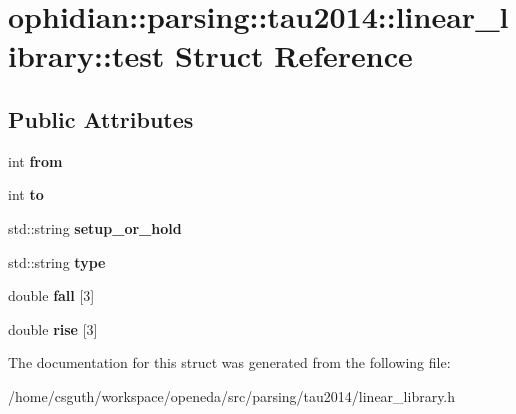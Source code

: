 \hypertarget{structophidian_1_1parsing_1_1tau2014_1_1linear__library_1_1test}{\section{ophidian\-:\-:parsing\-:\-:tau2014\-:\-:linear\-\_\-library\-:\-:test Struct Reference}
\label{structophidian_1_1parsing_1_1tau2014_1_1linear__library_1_1test}
}
\subsection*{Public Attributes}
\begin{DoxyCompactItemize}
\item 
\hypertarget{structophidian_1_1parsing_1_1tau2014_1_1linear__library_1_1test_a6c64fb1453fa088de253eb3b6b1468bf}{int {\bfseries from}}\label{structophidian_1_1parsing_1_1tau2014_1_1linear__library_1_1test_a6c64fb1453fa088de253eb3b6b1468bf}

\item 
\hypertarget{structophidian_1_1parsing_1_1tau2014_1_1linear__library_1_1test_a53e8a0b5c182065077f151941b2cd5f5}{int {\bfseries to}}\label{structophidian_1_1parsing_1_1tau2014_1_1linear__library_1_1test_a53e8a0b5c182065077f151941b2cd5f5}

\item 
\hypertarget{structophidian_1_1parsing_1_1tau2014_1_1linear__library_1_1test_a3ab41fae0e60c62d3907d91574afbf66}{std\-::string {\bfseries setup\-\_\-or\-\_\-hold}}\label{structophidian_1_1parsing_1_1tau2014_1_1linear__library_1_1test_a3ab41fae0e60c62d3907d91574afbf66}

\item 
\hypertarget{structophidian_1_1parsing_1_1tau2014_1_1linear__library_1_1test_ab676508e244f448dcd7d90905894f9ed}{std\-::string {\bfseries type}}\label{structophidian_1_1parsing_1_1tau2014_1_1linear__library_1_1test_ab676508e244f448dcd7d90905894f9ed}

\item 
\hypertarget{structophidian_1_1parsing_1_1tau2014_1_1linear__library_1_1test_afc455192107b8c47dd5b6d0597e861c3}{double {\bfseries fall} \mbox{[}3\mbox{]}}\label{structophidian_1_1parsing_1_1tau2014_1_1linear__library_1_1test_afc455192107b8c47dd5b6d0597e861c3}

\item 
\hypertarget{structophidian_1_1parsing_1_1tau2014_1_1linear__library_1_1test_ad8c8e51b3fcd8e499656ec9a0ca92840}{double {\bfseries rise} \mbox{[}3\mbox{]}}\label{structophidian_1_1parsing_1_1tau2014_1_1linear__library_1_1test_ad8c8e51b3fcd8e499656ec9a0ca92840}

\end{DoxyCompactItemize}


The documentation for this struct was generated from the following file\-:\begin{DoxyCompactItemize}
\item 
/home/csguth/workspace/openeda/src/parsing/tau2014/linear\-\_\-library.\-h\end{DoxyCompactItemize}
